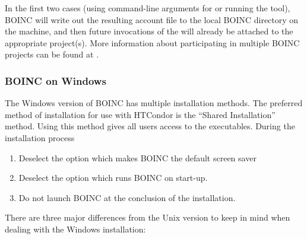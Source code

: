 In the first two cases (using command-line arguments for
 or running the  tool), BOINC
will write out the resulting account file to the local BOINC directory
on the machine, and then future invocations of the
 will already be attached to the appropriate
project(s).
More information about participating in multiple BOINC projects can be
found at .

\subsubsection{\label{sec:Backfill-BOINC-Windows}BOINC on Windows}

The Windows version of BOINC has multiple installation methods.
The preferred method of installation for use with HTCondor is the 
``Shared Installation'' method.
Using this method gives all users access to the executables.
During the installation process 
\begin{enumerate}
\item
Deselect the option which makes BOINC the default screen saver
\item
Deselect the option which runs BOINC on start-up.
\item
Do not launch BOINC at the conclusion of the installation.
\end{enumerate}

There are three major differences from the Unix version
to keep in mind when dealing with the Windows installation:

